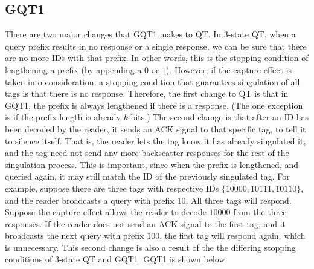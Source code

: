 \documentclass[conference]{IEEEtran}
\begin{document}
\subsection{GQT1}
There are two major changes that GQT1 makes to QT.  In 3-state QT, when a query prefix results in no response or a single response, we can be sure that there are no more IDs with that prefix.  In other words, this is the stopping condition of lengthening a prefix (by appending a $0$ or $1$).  However, if the capture effect is taken into consideration, a stopping condition that guarantees singulation of all tags is that there is no response.  Therefore, the first change to QT is that in GQT1, the prefix is always lengthened if there is a response.  (The one exception is if the prefix length is already $k$ bits.)  The second change is that after an ID has been decoded by the reader, it sends an ACK signal to that specific tag, to tell it to silence itself.  That is, the reader lets the tag know it has already singulated it, and the tag need not send any more backscatter responses for the rest of the singulation process.  This is important, since when the prefix is lengthened, and queried again, it may still match the ID of the previously singulated tag.  For example, suppose there are three tags with respective IDs $\{10000, 10111, 10110\}$, and the reader broadcasts a query with prefix $10$.  All three tags will respond.  Suppose the capture effect allows the reader to decode $10000$ from the three responses.  If the reader does not send an ACK signal to the first tag, and it broadcasts the next query with prefix $100$, the first tag will respond again, which is unnecessary.  This second change is also a result of the the differing stopping conditions of 3-state QT and GQT1.  GQT1 is shown below.
\end{document}
